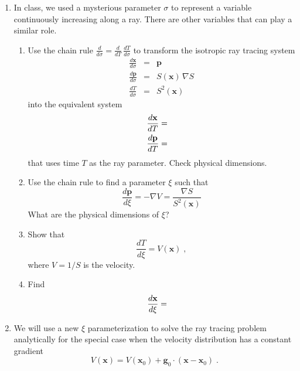 \begin{enumerate}
\item In class, we used a mysterious parameter $\sigma$ to represent a
  variable continuously increasing along a ray. There are other
  variables that can play a similar role.
\begin{enumerate}
\item Use the chain rule $\frac{d}{d \sigma} = \frac{d}{d T}\,\frac{d
T}{d \sigma}$ to transform the isotropic ray tracing system
\begin{eqnarray}
\label{eq:xsigma}
\frac{d \mathbf{x}}{d \sigma} & = & \mathbf{p} \\
\label{eq:psigma}
\frac{d \mathbf{p}}{d \sigma} & = & S(\mathbf{x})\,\nabla S \\
\label{eq:tsigma}
\frac{d T}{d \sigma} & = & S^2(\mathbf{x})
\end{eqnarray}
into the equivalent system
\begin{eqnarray}
\label{eq:xt}
\frac{d \mathbf{x}}{d T} = & & \hfill \\
\label{eq:pt}
\frac{d \mathbf{p}}{d T} = & & \hfill
\end{eqnarray}
that uses time $T$ as the ray parameter. Check physical dimensions.
\item Use the chain rule to find a parameter $\xi$ such that
\begin{equation}
\label{eq:pxi}
\frac{d \mathbf{p}}{d \xi} = - \nabla V = \frac{\nabla S}{S^2(\mathbf{x})}
\end{equation}
What are the physical dimensions of $\xi$?
\item Show that
\begin{equation}
  \label{eq:txi}
  \frac{d T}{d \xi} = V(\mathbf{x})\;,
\end{equation}
where $V=1/S$ is the velocity.
\item Find
\begin{eqnarray}
  \label{eq:xxi}
  \frac{d \mathbf{x}}{d \xi} = & & \hfill 
\end{eqnarray}
\end{enumerate}
\item We will use a new $\xi$ parameterization to solve the ray
tracing problem analytically for the special case when the velocity
distribution has a constant gradient
\begin{equation}
  \label{eq:v}
  V(\mathbf{x}) = V(\mathbf{x}_0) + \mathbf{g}_0 \cdot (\mathbf{x} - \mathbf{x}_0)\;.
\end{equation}
\begin{enumerate}

\end{enumerate}
\end{enumerate}
